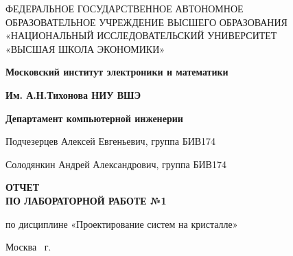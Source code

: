 \begin{titlepage}
	\begin{center}
		ФЕДЕРАЛЬНОЕ  ГОСУДАРСТВЕННОЕ АВТОНОМНОЕ \\
		ОБРАЗОВАТЕЛЬНОЕ УЧРЕЖДЕНИЕ ВЫСШЕГО ОБРАЗОВАНИЯ\\
		«НАЦИОНАЛЬНЫЙ ИССЛЕДОВАТЕЛЬСКИЙ УНИВЕРСИТЕТ\\
		«ВЫСШАЯ ШКОЛА ЭКОНОМИКИ»
	\end{center}
	
	\begin{center}
		\textbf{Московский институт электроники и математики}
		
		\textbf{Им. А.Н.Тихонова НИУ ВШЭ}
		
		\textbf{Департамент компьютерной инженерии}
	\end{center}
	\vspace{1ex}	
	\begin{center}
		Подчезерцев Алексей Евгеньевич, группа БИВ174
		
		Солодянкин Андрей Александрович, группа БИВ174
	\end{center}	
	\vspace{1ex}
	\begin{center}
		\textbf{ОТЧЕТ\\
		ПО ЛАБОРАТОРНОЙ РАБОТЕ №1
	}
	\end{center}	
	\vspace{2ex}
	\begin{center}
		по дисциплине «Проектирование систем на кристалле»
	\end{center}

	\vfill
	\begin{center}
		Москва \the\year \, г.
	\end{center}
\end{titlepage}